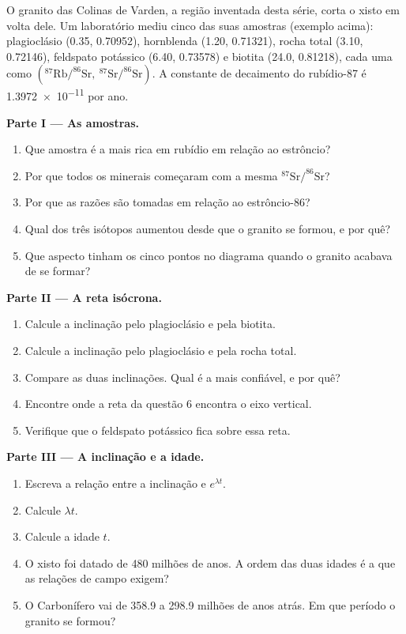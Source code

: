\begin{problem}
\label{pb:g12:age-of-the-earth:1}
O granito das Colinas de Varden, a região inventada desta série, corta o
xisto em volta dele. Um laboratório mediu cinco das suas amostras (exemplo
acima): plagioclásio (0.35, 0.70952), hornblenda (1.20, 0.71321), rocha
total (3.10, 0.72146), feldspato potássico (6.40, 0.73578) e biotita (24.0,
0.81218), cada uma como
$(^{87}\mathrm{Rb}/^{86}\mathrm{Sr},\ ^{87}\mathrm{Sr}/^{86}\mathrm{Sr})$. A
constante de decaimento do rubídio-87 é \num{1.3972e-11} por ano.

\medskip
\noindent\textbf{Parte I --- As amostras.}
\begin{enumerate}
  \item Que amostra é a mais rica em rubídio em relação ao estrôncio?
  \item Por que todos os minerais começaram com a mesma
        $^{87}\mathrm{Sr}/^{86}\mathrm{Sr}$?
  \item Por que as razões são tomadas em relação ao estrôncio-86?
  \item Qual dos três isótopos aumentou desde que o granito se formou, e por
        quê?
  \item Que aspecto tinham os cinco pontos no diagrama quando o granito
        acabava de se formar?
\end{enumerate}

\medskip
\noindent\textbf{Parte II --- A reta isócrona.}
\begin{enumerate}[resume]
  \item Calcule a inclinação pelo plagioclásio e pela biotita.
  \item Calcule a inclinação pelo plagioclásio e pela rocha total.
  \item Compare as duas inclinações. Qual é a mais confiável, e por quê?
  \item Encontre onde a reta da questão 6 encontra o eixo vertical.
  \item Verifique que o feldspato potássico fica sobre essa reta.
\end{enumerate}

\medskip
\noindent\textbf{Parte III --- A inclinação e a idade.}
\begin{enumerate}[resume]
  \item Escreva a relação entre a inclinação e $e^{\lambda t}$.
  \item Calcule $\lambda t$.
  \item Calcule a idade $t$.
  \item O xisto foi datado de 480 milhões de anos. A ordem das duas idades é
        a que as relações de campo exigem?
  \item O Carbonífero vai de 358.9 a 298.9 milhões de anos atrás. Em que
        período o granito se formou?
\end{enumerate}


\end{problem}

